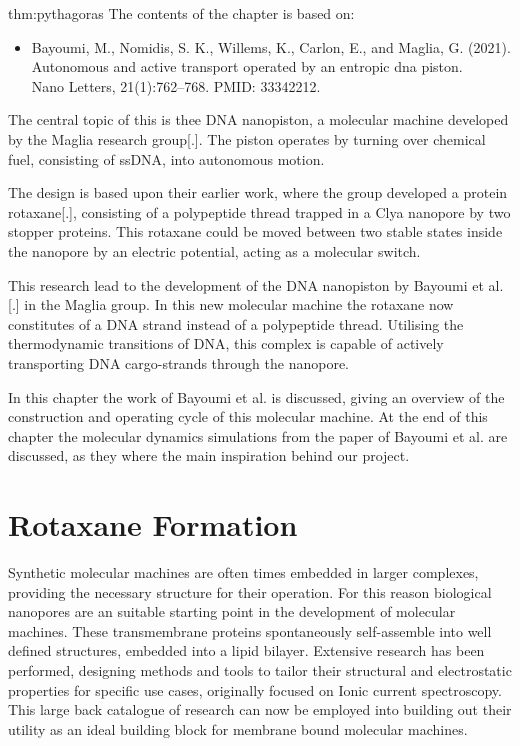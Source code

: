 
\begin{theo}{thm:pythagoras}
  The contents of the chapter is based on:
  \vspace{-0.4cm}
  \begin{itemize}
    \item Bayoumi, M., Nomidis, S. K., Willems, K., Carlon, E., and Maglia, G. (2021).
      Autonomous and active transport operated by an entropic dna piston.\\
      Nano Letters, 21(1):762–768. PMID: 33342212.
  \end{itemize}
  \vspace{0.3cm}
\end{theo}

The central topic of this is thee DNA nanopiston,  a molecular machine developed by the
Maglia research group[.]. The piston operates by turning over chemical fuel,
consisting of ssDNA,  into autonomous motion.

The design is based upon their earlier
work, where the group developed a protein rotaxane[.], consisting of a polypeptide thread
trapped in a Clya nanopore by two stopper proteins. This rotaxane could be moved between
two stable states inside the nanopore by an electric potential, acting as a molecular
switch.

This research lead to the development of the DNA nanopiston by Bayoumi et al.[.] in the
Maglia group. In this new molecular machine the rotaxane now constitutes of a DNA strand
instead of a polypeptide thread. Utilising the thermodynamic transitions of DNA, this
complex is capable of actively transporting DNA cargo-strands through the nanopore.

In this chapter the work of Bayoumi et al. is discussed, giving an overview of the
construction and operating cycle of this molecular machine.  At the end of this chapter
the molecular dynamics simulations from the paper of Bayoumi et al. are discussed, as
they where the main inspiration behind our project.

\section{Rotaxane Formation}


Synthetic molecular machines are often times embedded in larger complexes, providing the
necessary structure for their operation. For this reason biological nanopores are an
suitable starting point in the development of molecular machines. These transmembrane
proteins spontaneously self-assemble into well defined structures, embedded into a lipid
bilayer. Extensive research has been performed, designing methods and tools to tailor
their structural and electrostatic properties for specific use cases, originally focused
on Ionic current spectroscopy. This large back catalogue of research can now be employed
into building out their utility as an ideal building block for membrane bound molecular
machines.

